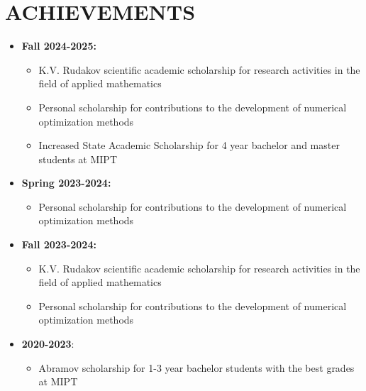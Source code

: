 \documentclass[11pt,a4paper]{moderncv}
\begin{document}
\section{ACHIEVEMENTS}
\begin{itemize}
    \item \textbf{Fall 2024-2025:}
    \begin{itemize}
        \item K.V. Rudakov scientific academic scholarship for research activities in the field of applied mathematics
        \item Personal scholarship for contributions to the development of numerical optimization methods
        \item Increased State Academic Scholarship for 4 year bachelor and master students at MIPT
    \end{itemize}
    \item \textbf{Spring 2023-2024:}
    \begin{itemize}
        \item Personal scholarship for contributions to the development of numerical optimization methods
    \end{itemize}
    \item \textbf{Fall 2023-2024:}
    \begin{itemize}
        \item K.V. Rudakov scientific academic scholarship for research activities in the field of applied mathematics
        \item Personal scholarship for contributions to the development of numerical optimization methods
    \end{itemize}
    \item \textbf{2020-2023}:
    \begin{itemize}
        \item Abramov scholarship for 1-3 year bachelor students with the best grades at MIPT
    \end{itemize}
\end{itemize}
\end{document}
